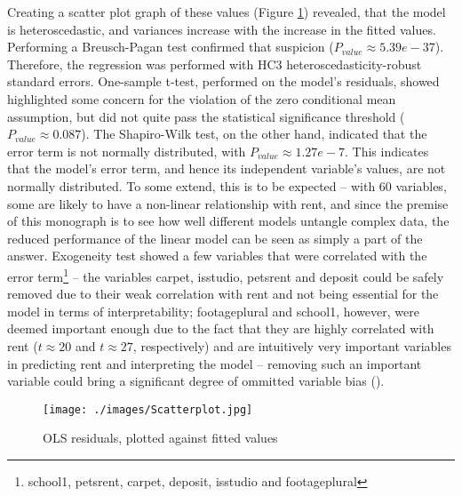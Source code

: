 \documentclass[12pt]{report}
\begin{document}
Creating a scatter plot graph of these values (Figure \ref{fig:heteroscedasticity}) revealed, that the model is heteroscedastic, and variances increase with the increase in the fitted values. Performing a Breusch-Pagan test confirmed that suspicion ($P_{value}\approx5.39e-37$). Therefore, the regression was performed with HC3 heteroscedasticity-robust standard errors. One-sample t-test, performed on the model's residuals, showed highlighted some concern for the violation of the zero conditional mean assumption, but did not quite pass the statistical significance threshold ($P_{value}\approx0.087$). The Shapiro-Wilk test, on the other hand, indicated that the error term is not normally distributed, with $P_{value}\approx1.27e-7$. This indicates that the model's error term, and hence its independent variable's values, are not normally distributed. To some extend, this is to be expected -- with 60 variables, some are likely to have a non-linear relationship with rent, and since the premise of this monograph is to see how well different models untangle complex data, the reduced performance of the linear model can be seen as simply a part of the answer. Exogeneity test showed a few variables that were correlated with the error term\footnote{school1, pets\textunderscore rent, carpet, deposit,  is\textunderscore studio and footageplural} -- the variables carpet, is\textunderscore studio, pets\textunderscore rent and deposit could be safely removed due to their weak correlation with rent and not being essential for the model in terms of interpretability; footageplural and school1, however, were deemed important enough due to the fact that they are highly correlated with rent ($t\approx20$ and $t\approx27$, respectively) and are intuitively very important variables in predicting rent and interpreting the model -- removing such an important variable could bring a significant degree of ommitted variable bias (\cite{walsch2021}).

\begin{figure}[h]
	\centering
	\texttt{[image: ./images/Scatterplot.jpg]}
	\caption{OLS residuals, plotted against fitted values}
	\label{fig:heteroscedasticity}
\end{figure}
\end{document}
